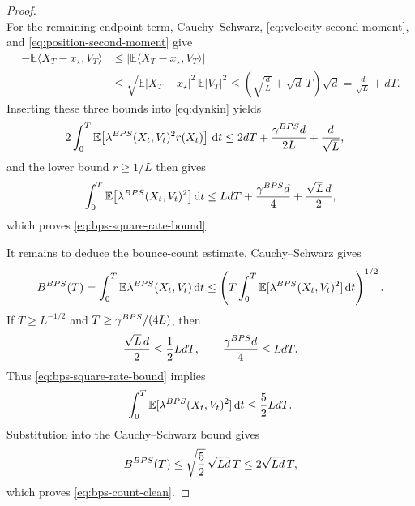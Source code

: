\documentclass[10pt,a4paper]{amsart}
\newcommand{\E}{\EE}
\newcommand{\EE}{\mathbb{E}}
\newcommand{\abs}[1]{\lvert#1\rvert}
\newcommand{\bps}{{\rm BPS}}
\newcommand{\dd}{\ud}
\newcommand{\ip}[2]{\langle #1,#2\rangle}
\newcommand{\ud}{\,\mathrm{d}}
\begin{document}
\begin{proof}
\[\]
For the remaining endpoint term, Cauchy--Schwarz,
\eqref{eq:velocity-second-moment}, and
\eqref{eq:position-second-moment} give
\[
\begin{aligned}
        -\E\ip{X_T-x_\star}{V_T}
        &\le
        \left|\E\ip{X_T-x_\star}{V_T}\right|\\
        &\le
        \sqrt{\E\abs{X_T-x_\star}^2\,\E\abs{V_T}^2}
        \le\left(\sqrt{\frac dL}+\sqrt d\,T\right)\sqrt d =\frac d{\sqrt L}+dT.
\end{aligned}
\]
Inserting these three bounds into \eqref{eq:dynkin} yields
\[
\begin{aligned}
        2\int_0^T\E\!\left[
          \lambda^{\bps}(X_t,V_t)^2r(X_t)
        \right]\dd t
        &\le 2dT+\frac{\gamma^{\bps}d}{2L}+\frac d{\sqrt L},
\end{aligned}
\]
and the lower bound $r\ge1/L$ then gives
\[
        \int_0^T
        \E\bigl[\lambda^{\bps}(X_t,V_t)^2\bigr]\dd t
        \le LdT+\frac{\gamma^{\bps}d}{4}+\frac{\sqrt L\,d}{2},
\]
which proves \eqref{eq:bps-square-rate-bound}.

It remains to deduce the bounce-count estimate. Cauchy--Schwarz gives
\[
        B^{\bps}(T)
        =\int_0^T\E\lambda^{\bps}(X_t,V_t)\dd t
        \le\left(
          T\int_0^T\E[\lambda^{\bps}(X_t,V_t)^2]\dd t
        \right)^{1/2}.
\]
If $T\ge L^{-1/2}$ and $T\ge\gamma^{\bps}/(4L)$, then
\[
        \frac{\sqrt L\,d}{2}\le\frac12LdT,
        \qquad
        \frac{\gamma^{\bps}d}{4}\le LdT.
\]
Thus \eqref{eq:bps-square-rate-bound} implies
\[
        \int_0^T\E[\lambda^{\bps}(X_t,V_t)^2]\dd t
        \le\frac52LdT.
\]
Substitution into the Cauchy--Schwarz bound gives
\[
        B^{\bps}(T)
        \le\sqrt{\frac52}\,\sqrt{Ld}\,T
        \le2\sqrt{Ld}\,T,
\]
which proves \eqref{eq:bps-count-clean}.
\end{proof}
\end{document}
